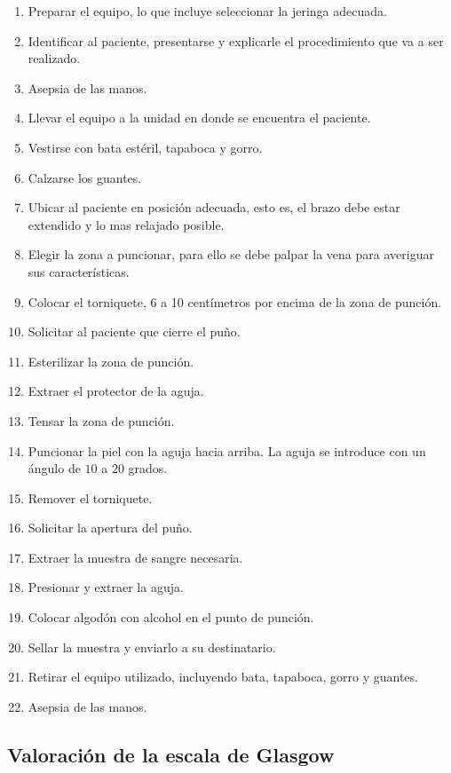 \begin{enumerate}
\item Preparar el equipo, lo que incluye seleccionar la jeringa adecuada.
\item Identificar al paciente, presentarse y explicarle el procedimiento que va
    a ser realizado.
\item Asepsia de las manos.
\item Llevar el equipo a la unidad en donde se encuentra el paciente.
\item Vestirse con bata estéril, tapaboca y gorro.
\item Calzarse los guantes.
\item Ubicar al paciente en posición adecuada, esto es, el brazo debe estar
    extendido y lo mas relajado posible.
\item Elegir la zona a puncionar, para ello se debe palpar la vena para
    averiguar sus características.
\item Colocar el torniquete, 6 a 10 centímetros por encima de la zona de
    punción.
\item Solicitar al paciente que cierre el puño.
\item Esterilizar la zona de punción.
\item Extraer el protector de la aguja.
\item Tensar la zona de punción.
\item Puncionar la piel con la aguja hacia arriba. La aguja se introduce con un
    ángulo de $10$ a $20$ grados.
\item Remover el torniquete.
\item Solicitar la apertura del puño.
\item Extraer la muestra de sangre necesaria.
\item Presionar y extraer la aguja.
\item Colocar algodón con alcohol en el punto de punción.
\item Sellar la muestra y enviarlo a su destinatario.
\item Retirar el equipo utilizado, incluyendo bata, tapaboca, gorro y guantes.
\item Asepsia de las manos.
\end{enumerate}

\subsection{Valoración de la escala de Glasgow}
\label{sec:glasgow}

